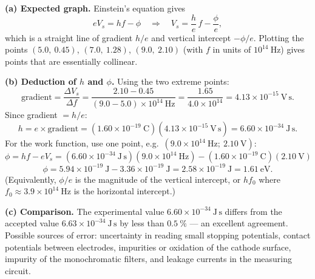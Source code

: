 \documentclass[11pt]{article}
\begin{document}
\begin{corrige}
\textbf{(a) Expected graph.} Einstein's equation gives
\[ eV_s = hf - \phi \quad\Longrightarrow\quad V_s = \frac{h}{e}\,f - \frac{\phi}{e}, \]
which is a straight line of gradient $h/e$ and vertical intercept $-\phi/e$. Plotting the points $(5.0,\ 0.45)$, $(7.0,\ 1.28)$, $(9.0,\ 2.10)$ (with $f$ in units of $10^{14}\ \mathrm{Hz}$) gives points that are essentially collinear.

\textbf{(b) Deduction of $h$ and $\phi$.} Using the two extreme points:
\[ \text{gradient} = \frac{\Delta V_s}{\Delta f} = \frac{2.10 - 0.45}{(9.0 - 5.0)\times 10^{14}\ \mathrm{Hz}} = \frac{1.65}{4.0\times 10^{14}} = 4.13\times 10^{-15}\ \mathrm{V\,s}. \]
Since gradient $= h/e$:
\[ h = e \times \text{gradient} = (1.60\times 10^{-19}\ \mathrm{C})(4.13\times 10^{-15}\ \mathrm{V\,s}) = 6.60\times 10^{-34}\ \mathrm{J\,s}. \]
For the work function, use one point, e.g.\ $(9.0\times 10^{14}\ \mathrm{Hz};\ 2.10\ \mathrm{V})$:
\[ \phi = hf - eV_s = (6.60\times 10^{-34}\ \mathrm{J\,s})(9.0\times 10^{14}\ \mathrm{Hz}) - (1.60\times 10^{-19}\ \mathrm{C})(2.10\ \mathrm{V}) \]
\[ \phi = 5.94\times 10^{-19}\ \mathrm{J} - 3.36\times 10^{-19}\ \mathrm{J} = 2.58\times 10^{-19}\ \mathrm{J} = 1.61\ \mathrm{eV}. \]
(Equivalently, $\phi/e$ is the magnitude of the vertical intercept, or $hf_0$ where $f_0 \approx 3.9\times 10^{14}\ \mathrm{Hz}$ is the horizontal intercept.)

\textbf{(c) Comparison.} The experimental value $6.60\times 10^{-34}\ \mathrm{J\,s}$ differs from the accepted value $6.63\times 10^{-34}\ \mathrm{J\,s}$ by less than $0.5\ \%$ — an excellent agreement. Possible sources of error: uncertainty in reading small stopping potentials, contact potentials between electrodes, impurities or oxidation of the cathode surface, impurity of the monochromatic filters, and leakage currents in the measuring circuit.
\end{corrige}
\end{document}
